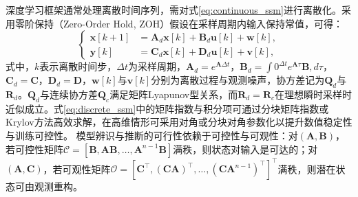 深度学习框架通常处理离散时间序列，需对式\eqref{eq:continuous_ssm}进行离散化。采用零阶保持（Zero-Order Hold, ZOH）假设在采样周期内输入保持常值\cite{galias2008analysis, gupta2022diagonal}，可得：
\begin{equation}
\left\{
\begin{aligned}
\mathbf{x}[k+1] &= \mathbf{A}_d\mathbf{x}[k] + \mathbf{B}_d\mathbf{u}[k] + \mathbf{w}[k], \\
\mathbf{y}[k] &= \mathbf{C}_d\mathbf{x}[k] + \mathbf{D}_d\mathbf{u}[k] + \mathbf{v}[k],
\end{aligned}
\right.
\label{eq:discrete_ssm}
\end{equation}
式中，$k$表示离散时间步，$\Delta t$为采样周期，$\mathbf{A}_d=e^{\mathbf{A}\Delta t}$，$\mathbf{B}_d=\int{0}^{\Delta t}e^{\mathbf{A}\tau}\mathbf{B},d\tau$，$\mathbf{C}_d=\mathbf{C}$，$\mathbf{D}_d=\mathbf{D}$，$\mathbf{w}[k]$与$\mathbf{v}[k]$分别为离散过程与观测噪声，协方差记为$\mathbf{Q}_d$与$\mathbf{R}_d$。$\mathbf{Q}_d$与连续协方差$\mathbf{Q}_c$满足矩阵Lyapunov型关系，而$\mathbf{R}_d=\mathbf{R}_c$在理想瞬时采样时近似成立。式\eqref{eq:discrete_ssm}中的矩阵指数与积分项可通过分块矩阵指数或Krylov方法高效求解\cite{boley1994krylov}，在高维情形可采用对角或分块对角参数化以提升数值稳定性与训练可控性\cite{gupta2022diagonal, gu2022parameterization}。
模型辨识与推断的可行性依赖于可控性与可观性：对$(\mathbf{A},\mathbf{B})$，若可控性矩阵$\mathcal{C}=[\mathbf{B}, \mathbf{A}\mathbf{B}, \dots, \mathbf{A}^{n-1}\mathbf{B}]$满秩，则状态对输入是可达的；对$(\mathbf{A},\mathbf{C})$，若可观性矩阵$\mathcal{O}=[\mathbf{C}^{\top}, (\mathbf{C}\mathbf{A})^{\top}, \dots, (\mathbf{C}\mathbf{A}^{n-1})^{\top}]^{\top}$满秩，则潜在状态可由观测重构。


